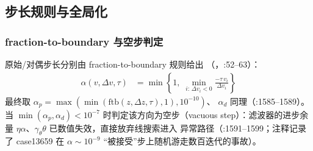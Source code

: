 \subsection{步长规则与全局化}\label{subsec:pipm-step}

\subsubsection*{fraction-to-boundary 与空步判定}
原始/对偶步长分别由 fraction-to-boundary 规则给出
（，:52--63）：
\begin{align*}
\alpha(v,\Delta v,\tau) &= \min\!\left\{1,\;
\min_{i:\,\Delta v_i<0}\frac{-\tau\, v_i}{\Delta v_i}\right\}
\end{align*}
最终取 $\alpha_p=\max(\min(\mathrm{ftb}(z,\Delta z,\tau),1),10^{-10})$、
$\alpha_d$ 同理（:1585--1589）。当 $\min(\alpha_p,\alpha_d)<10^{-7}$
时判定该方向为空步（vacuous step）：滤波器的进步余量
$\eta\alpha$、$\gamma_\theta\theta$ 已数值失效，直接放弃线搜索进入
异常路径（:1591--1599；注释记录了 case13659 在 $\alpha\sim10^{-9}$
“被接受”步上随机游走数百迭代的事故）。

